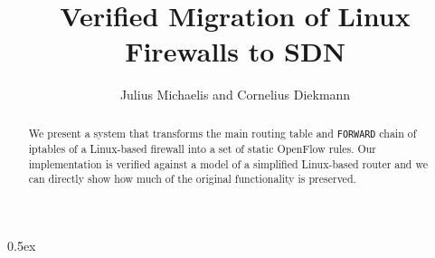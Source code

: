 \documentclass[a4paper]{article}
\begin{document}
\title{Verified Migration of Linux Firewalls to SDN}
\author{Julius Michaelis and Cornelius Diekmann}
\maketitle

\begin{abstract}
	We present a system that transforms the main routing table and \texttt{FORWARD} chain of iptables of a Linux-based firewall into a set of static OpenFlow rules.
	Our implementation is verified against a model of a simplified Linux-based router and we can directly show how much of the original functionality is preserved.
\end{abstract}


\parindent 0pt\parskip 0.5ex










%
%
\end{document}
